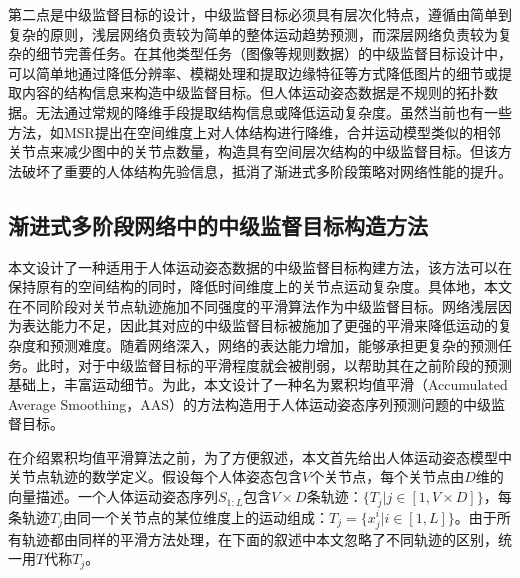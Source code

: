 第二点是中级监督目标的设计，中级监督目标必须具有层次化特点，遵循由简单到复杂的原则，浅层网络负责较为简单的整体运动趋势预测，而深层网络负责较为复杂的细节完善任务。在其他类型任务（图像等规则数据）的中级监督目标设计中，可以简单地通过降低分辨率、模糊处理和提取边缘特征等方式降低图片的细节或提取内容的结构信息来构造中级监督目标。但人体运动姿态数据是不规则的拓扑数据。无法通过常规的降维手段提取结构信息或降低运动复杂度。虽然当前也有一些方法，如MSR\parencite{dang2021msr}提出在空间维度上对人体结构进行降维，合并运动模型类似的相邻关节点来减少图中的关节点数量，构造具有空间层次结构的中级监督目标。但该方法破坏了重要的人体结构先验信息，抵消了渐进式多阶段策略对网络性能的提升。

\subsection{渐进式多阶段网络中的中级监督目标构造方法}
本文设计了一种适用于人体运动姿态数据的中级监督目标构建方法，该方法可以在保持原有的空间结构的同时，降低时间维度上的关节点运动复杂度。具体地，本文在不同阶段对关节点轨迹施加不同强度的平滑算法作为中级监督目标。网络浅层因为表达能力不足，因此其对应的中级监督目标被施加了更强的平滑来降低运动的复杂度和预测难度。随着网络深入，网络的表达能力增加，能够承担更复杂的预测任务。此时，对于中级监督目标的平滑程度就会被削弱，以帮助其在之前阶段的预测基础上，丰富运动细节。为此，本文设计了一种名为累积均值平滑（Accumulated Average Smoothing，AAS）的方法构造用于人体运动姿态序列预测问题的中级监督目标。

在介绍累积均值平滑算法之前，为了方便叙述，本文首先给出人体运动姿态模型中关节点轨迹的数学定义。假设每个人体姿态包含$V$个关节点，每个关节点由$D$维的向量描述。一个人体运动姿态序列$S_{1:L}$包含$V \times D$条轨迹：$\{T_j|j\in[1, V\times D]\}$，每条轨迹$T_j$由同一个关节点的某位维度上的运动组成：$T_j=\{x^i_j|i\in[1,L]\}$。由于所有轨迹都由同样的平滑方法处理，在下面的叙述中本文忽略了不同轨迹的区别，统一用$T$代称$T_j$。


